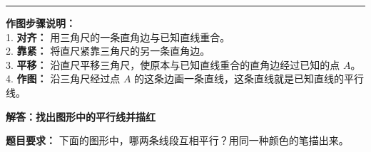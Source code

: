 \documentclass[12pt, a4paper]{ctexart}
\begin{document}
\vspace{1.0cm}
\hrule
\vspace{0.4cm}

{\small
\textbf{作图步骤说明：} \\
1. \textbf{对齐：} 用三角尺的一条直角边与已知直线重合。 \\
2. \textbf{靠紧：} 将直尺紧靠三角尺的另一条直角边。 \\
3. \textbf{平移：} 沿直尺平移三角尺，使原本与已知直线重合的直角边经过已知的点 $A$。 \\
4. \textbf{作图：} 沿三角尺经过点 $A$ 的这条边画一条直线，这条直线就是已知直线的平行线。
}


\newpage

\begin{center}
  {\large\bfseries 解答：找出图形中的平行线并描红}
\end{center}

\vspace{0.6cm}

\noindent
{\small \textbf{题目要求：} 下面的图形中，哪两条线段互相平行？用同一种颜色的笔描出来。}

\vspace{0.8cm}
\end{document}
